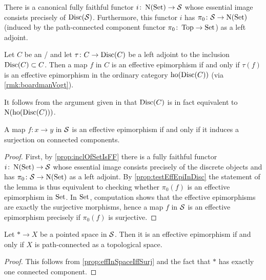\begin{prop}\label{prop:inclOfSetIsFF}
    There is a canonical fully faithful functor $i\colon\operatorname{N}(\operatorname{Set})\to\mathcal{S}$ whose essential image consists precisely of $\operatorname{Disc}(\mathcal{S})$.
    Furthermore, this functor $i$ has $\pi_0\colon\mathcal{S}\to\operatorname{N}(\operatorname{Set})$ (induced by the path-connected component functor $\pi_0\colon\operatorname{Top}\to\operatorname{Set}$) as a left adjoint.
    \begin{reference}
        \cite[Proposition 7.8.3]{cisinski_2019}
    \end{reference}
\end{prop}
\begin{prop}\label{prop:testEffEpiInDisc}
    Let $C$ be an \inftytop/ and let $\tau\colon C\to\operatorname{Disc}(C)$ be a left adjoint to the inclusion $\operatorname{Disc}(C)\subset C$.
    Then a map $f$ in $C$ is an effective epimorphism if and only if $\tau(f)$ is an effective epimorphism in the ordinary category $\operatorname{ho}(\operatorname{Disc}(C))$ (via \cref{rmk:boardmanVogt}).
    \begin{reference}
        \cite[Proposition 7.2.1.14]{HTT}
    \end{reference}
\end{prop}
\begin{remark}
    It follows from the argument given in \cite[Notation 5.5.6.2]{HTT} that $\operatorname{Disc}(C)$ is in fact equivalent to $\operatorname{N}(\operatorname{ho}(\operatorname{Disc}(C)))$.
\end{remark}
\begin{prop}\label{prop:effInSpaceIffSurj}
    A map $f\colon x\to y$ in $\mathcal{S}$ is an effective epimorphism if and only if it induces a surjection on connected components.
    \begin{proof}
        First, by \cref{prop:inclOfSetIsFF} there is a fully faithful functor $i\colon\operatorname{N}(\operatorname{Set})\to\mathcal{S}$ whose essential image consists precisely of the discrete objects and has $\pi_0\colon\mathcal{S}\to\operatorname{N}(\operatorname{Set})$ as a left adjoint.
        By \cref{prop:testEffEpiInDisc} the statement of the lemma is thus equivalent to checking whether $\pi_0(f)$ is an effective epimorphism in $\operatorname{Set}$.
        In $\operatorname{Set}$, computation shows that the effective epimorphisms are exactly the surjective morphisms, hence a map $f$ in $\mathcal{S}$ is an effective epimorphism precisely if $\pi_0(f)$ is surjective. %
    \end{proof}
\end{prop}
\begin{corollary}
    Let $*\to X$ be a pointed space in $\mathcal{S}$.
    Then it is an effective epimorphism if and only if $X$ is path-connected as a topological space.
    \begin{proof}
        This follows from \cref{prop:effInSpaceIffSurj} and the fact that $*$ has exactly one connected component.
    \end{proof}
\end{corollary}